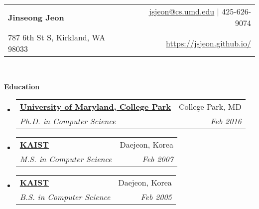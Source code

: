 \documentclass[letterpaper,11pt]{article}
\makeatletter
\newcommand{\resheading}[1]{{\large \colorbox{mygrey}{\begin{minipage}{\textwidth}{\textbf{#1 \vphantom{p\^{E}}}}\end{minipage}}}}
\newcommand{\ressubheading}[4]{
\begin{tabular*}{6.5in}{l@{\extracolsep{\fill}}r}
    \textbf{#1} & #2 \\
    \textit{#3} & \textit{#4} \\
\end{tabular*}\vspace{-6pt}}
\makeatother
\begin{document}
\newcommand{\mywebheader}{
\begin{tabular*}{7in}{l@{\extracolsep{\fill}}r}
  \textbf{{\LARGE Jinseong Jeon}}
& \href{mailto:jsjeon@cs.umd.edu}{jsjeon@cs.umd.edu} \hspace{1mm}$\vert$\hspace{1mm} 425-626-9074
\\
  {\small 787 6th St S, Kirkland, WA 98033}
& \href{https://jsjeon.github.io/}{\url{https://jsjeon.github.io/}}
\\
\end{tabular*}
\\
\vspace{0.1in}}

\mywebheader

\resheading{Education}
  \begin{itemize}
    \item
      \ressubheading{\href{https://www.cs.umd.edu}{University of Maryland, College Park}}{College Park, MD}{{Ph.D. in Computer Science}}{Feb 2016}
    \item
      \ressubheading{\href{https://cs.kaist.ac.kr}{KAIST}}{Daejeon, Korea}{{M.S. in Computer Science}}{Feb 2007}
\begin{comment}
Outstanding Master's Thesis Award from Dept. of Computer Science, KAIST
\end{comment}
    \item
      \ressubheading{\href{https://cs.kaist.ac.kr}{KAIST}}{Daejeon, Korea}{{B.S. in Computer Science}}{Feb 2005}
\begin{comment}
Graduated with High Honor (\emph{Magna Cum Laude})
\end{comment}
  \end{itemize} %
\end{document}
